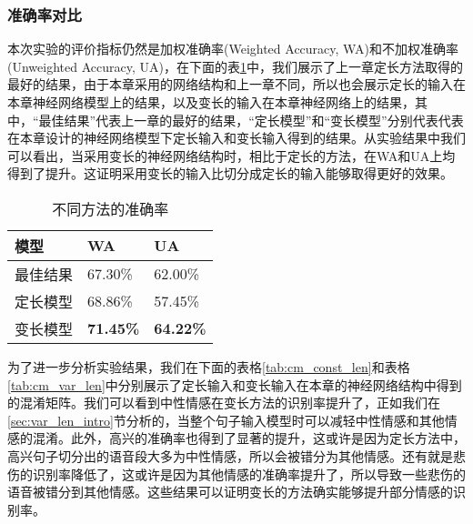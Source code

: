 \subsubsection{准确率对比}
\label{sec:var_len_experiement_acc}
本次实验的评价指标仍然是加权准确率(Weighted Accuracy, WA)和不加权准确率(Unweighted Accuracy, UA)，在下面的表\ref{tab:acc_var_len}中，我们展示了上一章定长方法取得的最好的结果，由于本章采用的网络结构和上一章不同，所以也会展示定长的输入在本章神经网络模型上的结果，以及变长的输入在本章神经网络上的结果，其中，“最佳结果”代表上一章的最好的结果，“定长模型”和“变长模型”分别代表代表在本章设计的神经网络模型下定长输入和变长输入得到的结果。从实验结果中我们可以看出，当采用变长的神经网络结构时，相比于定长的方法，在WA和UA上均得到了提升。这证明采用变长的输入比切分成定长的输入能够取得更好的效果。
\begin{table}[htb]
\centering
\begin{minipage}[t]{0.8\linewidth} %
\caption{不同方法的准确率}
\label{tab:acc_var_len}
    \begin{tabularx}{\linewidth}{X<{\centering} X<{\centering} X<{\centering}}
        \toprule[1.5pt]
        模型 & WA & UA \\
        \midrule[1pt]
        最佳结果 & 67.30\% & 62.00\% \\
        定长模型 & 68.86\% & 57.45\% \\
        变长模型 & \textbf{71.45\%} & \textbf{64.22\%} \\
        \bottomrule[1.5pt]
    \end{tabularx}
\end{minipage}
\end{table}

为了进一步分析实验结果，我们在下面的表格\ref{tab:cm_const_len}和表格\ref{tab:cm_var_len}中分别展示了定长输入和变长输入在本章的神经网络结构中得到的混淆矩阵。我们可以看到中性情感在变长方法的识别率提升了，正如我们在\ref{sec:var_len_intro}节分析的，当整个句子输入模型时可以减轻中性情感和其他情感的混淆。此外，高兴的准确率也得到了显著的提升，这或许是因为定长方法中，高兴句子切分出的语音段大多为中性情感，所以会被错分为其他情感。还有就是悲伤的识别率降低了，这或许是因为其他情感的准确率提升了，所以导致一些悲伤的语音被错分到其他情感。这些结果可以证明变长的方法确实能够提升部分情感的识别率。

